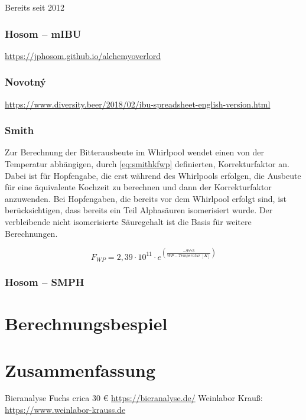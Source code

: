 \documentclass[a4paper,parskip=half]{scrartcl}
\begin{document}
Bereits seit 2012

\parencite{Wolf2022}

\subsubsection*{Hosom – mIBU}

\url{https://jphosom.github.io/alchemyoverlord}

\parencite{Hosom2015}

\subsubsection*{Novotný}

\url{https://www.diversity.beer/2018/02/ibu-spreadsheet-english-version.html}
\parencite{Novotny2016}
\parencite{Novotny2018}

\subsubsection*{Smith}

Zur Berechnung der Bitterausbeute im Whirlpool wendet \citeauthor{Smith2019}
einen von der Temperatur abhängigen, durch \autoref{eq:smithkfwp} definierten,
Korrekturfaktor an. Dabei ist für Hopfengabe, die erst während des Whirlpools
erfolgen, die Ausbeute für eine äquivalente Kochzeit zu berechnen und dann der
Korrekturfaktor anzuwenden. Bei Hopfengaben, die bereits vor dem Whirlpool erfolgt
sind, ist berücksichtigen, dass bereits ein Teil Alphasäuren isomerisiert wurde.
Der verbleibende nicht isomerisierte Säuregehalt ist die Basis für weitere
Berechnungen. \parencite{Smith2019}

\begin{equation}
\mathit{F}_{\mathit{WP}} = 2,39 \cdot 10^{11} \cdot e^{\left(\frac{-9773}{\mathit{WP-Temperatur}\:[K]} \right)}
\label{eq:smithkfwp}
\end{equation}

\subsubsection*{Hosom – SMPH}

\parencite{Hosom2021}

\section*{Berechnungsbespiel}

\section*{Zusammenfassung}

\parencite{Janish2019}
\parencite{Hieronymus2012}
\parencite{Nottebohm2020}
\parencite{Hall1997}
\parencite{Pyle1995}
\parencite{Justus2018}
\parencite{Parkin2017}
\parencite{Bishop1964}
\parencite{Nickerson1979}
\parencite{Calado2019}
\parencite{Weiss2019}

\parencite{Bruecklmeier2017}
\parencite{Bruecklmeier2018}

Bieranalyse Fuchs crica 30 € \url{https://bieranalyse.de/}
Weinlabor Krauß: \url{https://www.weinlabor-krauss.de}

\printbibliography[title=Quellen]
\end{document}
